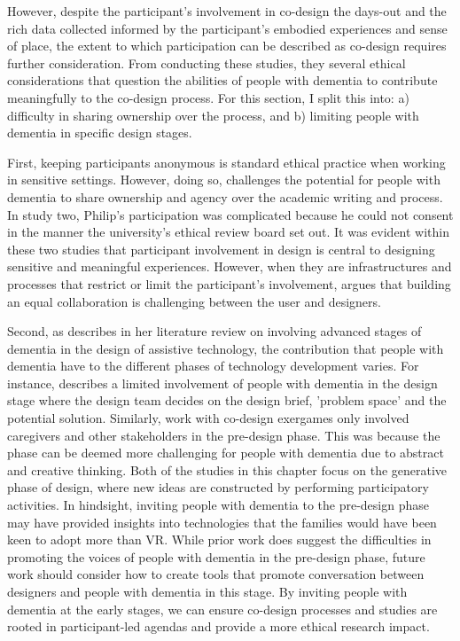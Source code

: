 However, despite the participant's involvement in co-design the days-out and the rich data collected informed by the participant's embodied experiences and sense of place, the extent to which participation can be described as co-design requires further consideration. From conducting these studies, they several ethical considerations that question the abilities of people with dementia to contribute meaningfully to the co-design process. For this section, I split this into: a)  difficulty in sharing ownership over the process, and b) limiting people with dementia in specific design stages.

First, keeping participants anonymous is standard ethical practice when working in sensitive settings. However, doing so, challenges the potential for people with dementia to share ownership and agency over the academic writing and process. In study two, Philip's participation was complicated because he could not consent in the manner the university's ethical review board set out. It was evident within these two studies that participant involvement in design is central to designing sensitive and meaningful experiences. However, when they are infrastructures and processes that restrict or limit the participant's involvement, \cite{hendriks_challenges_2014} argues that building an equal collaboration is challenging between the user and designers.

Second, as \cite{suijkerbuijk_active_2019} describes in her literature review on involving advanced stages of dementia in the design of assistive technology, the contribution that people with dementia have to the different phases of technology development varies. For instance, \cite{rodgers2015designing} describes a limited involvement of people with dementia in the design stage where the design team decides on the design brief, 'problem space' and the potential solution. Similarly, \cite{unbehaun_facilitating_2018} work with co-design exergames only involved caregivers and other stakeholders in the pre-design phase. This was because the phase can be deemed more challenging for people with dementia due to abstract and creative thinking. Both of the studies in this chapter focus on the generative phase of design, where new ideas are constructed by performing participatory activities. In hindsight, inviting people with dementia to the pre-design phase may have provided insights into technologies that the families would have been keen to adopt more than VR. While prior work does suggest the difficulties in promoting the voices of people with dementia in the pre-design phase, future work should consider how to create tools that promote conversation between designers and people with dementia in this stage. By inviting people with dementia at the early stages, we can ensure co-design processes and studies are rooted in participant-led agendas and provide a more ethical research impact.


